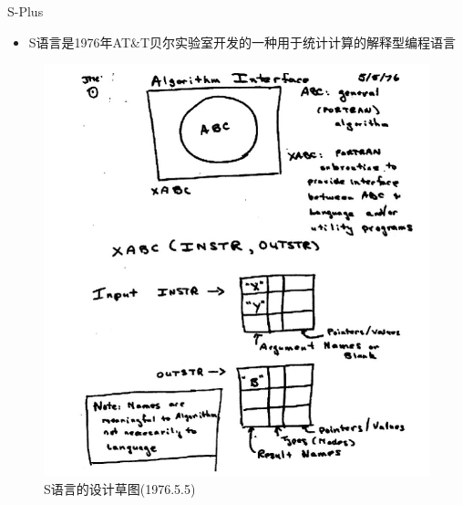 \documentclass{beamerthemeMono}
\begin{document}
\begin{frame}[t]{\subsecname}{S-Plus}
    \begin{itemize}
      \item S语言是1976年AT\&T贝尔实验室开发的一种用于统计计算的解释型编程语言
    \end{itemize}

    \begin{figure}
      \centering \includegraphics[width=0.5\columnwidth]{S_init.png}
      \caption{S语言的设计草图(1976.5.5)}
    \end{figure}

\end{frame}   
\end{document}
